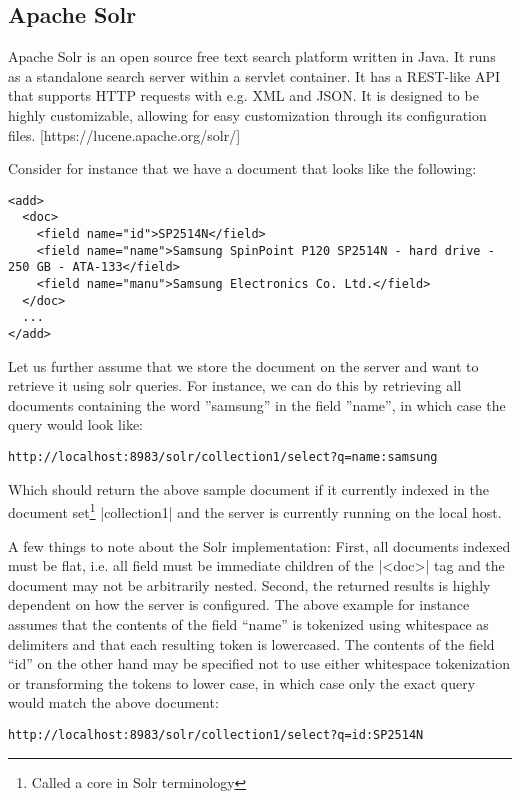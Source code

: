 \subsection{Apache Solr}

Apache Solr is an open source free text search platform written in Java. It runs as a standalone search server within a servlet container. It has a REST-like API that supports HTTP requests with e.g. XML and JSON. It is designed to be highly customizable, allowing for easy customization through its configuration files.
[https://lucene.apache.org/solr/]

Consider for instance that we have a document that looks like the following:

\begin{verbatim}
<add>
  <doc>
    <field name="id">SP2514N</field>
    <field name="name">Samsung SpinPoint P120 SP2514N - hard drive - 250 GB - ATA-133</field>
    <field name="manu">Samsung Electronics Co. Ltd.</field>
  </doc>
  ...
</add>
\end{verbatim}

Let us further assume that we store the document on the server and want to retrieve it using solr queries. For instance, we can do this by retrieving all documents containing the word ''samsung'' in the field ''name'', in which case the query would look like:

\begin{verbatim}
http://localhost:8983/solr/collection1/select?q=name:samsung
\end{verbatim}

Which should return the above sample document if it currently indexed in the document set\footnote{Called a core in Solr terminology} |collection1| and the server is currently running on the local host.

A few things to note about the Solr implementation: First, all documents indexed must be flat, i.e. all  field must be immediate children of the |<doc>| tag and the document may not be arbitrarily nested. Second, the returned results is highly dependent on how the server is configured. The above example for instance assumes that the contents of the field “name” is tokenized using whitespace as delimiters and that each resulting token is lowercased. The contents of the field “id” on the other hand may be specified not to use either whitespace tokenization or transforming the tokens to lower case, in which case only the exact query would match the above document:

\begin{verbatim}
http://localhost:8983/solr/collection1/select?q=id:SP2514N
\end{verbatim}









